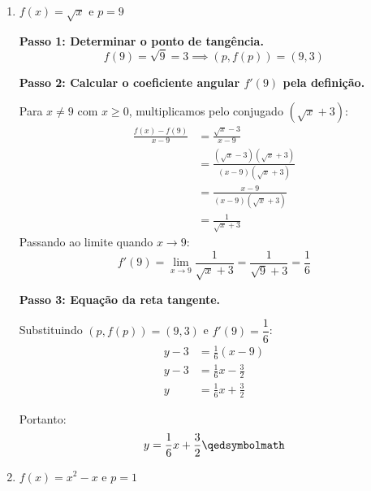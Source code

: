 \begin{enumerate}[label=\alph*)]
    \textbf{Passo 3: Equação da reta tangente.}

    Substituindo $(p, f(p)) = \left(2, \dfrac{1}{2}\right)$ e $f'(2) = -\dfrac{1}{4}$:
    \begin{align*}
        y - \frac{1}{2} &= -\frac{1}{4}(x - 2) \\[0.25cm]
        y - \frac{1}{2} &= -\frac{1}{4}x + \frac{1}{2} \\[0.25cm]
        y &= -\frac{1}{4}x + 1
    \end{align*}

    Portanto:
    \[
    y = -\frac{1}{4}x + 1 \qedsymbolmath
    \]

    \item $f(x) = \sqrt{x}$ e $p = 9$
    
    \textbf{Passo 1: Determinar o ponto de tangência.}
    \[
    f(9) = \sqrt{9} = 3 \implies (p, f(p)) = (9, 3)
    \]

    \textbf{Passo 2: Calcular o coeficiente angular $f'(9)$ pela definição.}

    Para $x \neq 9$ com $x \ge 0$, multiplicamos pelo conjugado $(\sqrt{x} + 3)$:
    \begin{align*}
        \frac{f(x) - f(9)}{x - 9} &= \frac{\sqrt{x} - 3}{x - 9} \\[0.25cm]
        &= \frac{(\sqrt{x} - 3)(\sqrt{x} + 3)}{(x - 9)(\sqrt{x} + 3)} \\[0.25cm]
        &= \frac{x - 9}{(x - 9)(\sqrt{x} + 3)} \\[0.25cm]
        &= \frac{1}{\sqrt{x} + 3}
    \end{align*}
    Passando ao limite quando $x \to 9$:
    \[
    f'(9) = \lim_{x \to 9} \frac{1}{\sqrt{x} + 3} = \frac{1}{\sqrt{9} + 3} = \frac{1}{6}
    \]

    \textbf{Passo 3: Equação da reta tangente.}

    Substituindo $(p, f(p)) = (9, 3)$ e $f'(9) = \dfrac{1}{6}$:
    \begin{align*}
        y - 3 &= \frac{1}{6}(x - 9) \\[0.25cm]
        y - 3 &= \frac{1}{6}x - \frac{3}{2} \\[0.25cm]
        y &= \frac{1}{6}x + \frac{3}{2}
    \end{align*}

    Portanto:
    \[
    y = \frac{1}{6}x + \frac{3}{2} \qedsymbolmath
    \]

    \item $f(x) = x^2 - x$ e $p = 1$
    

\end{enumerate}
